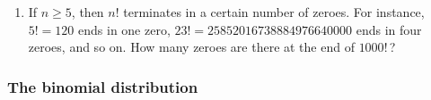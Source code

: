 \begin{enumerate}
\begin{enumerate}
  \item Use Stirling's approximation to show that
\[
a_N\approx \dfrac{e^N}{\sqrt{2\pi N}}.
\]
Calculate the values of this expression for $N=10$ and $N=100$ to get
an idea of how large the sequence $\{a_n\}$ can get.  This shows that
{\em for a while}, the exponential series $\{N^n\}$ can get large much
more rapidly than the series $\{n!\}$.

  \item Show that $a_n<1$ if $n>eN$.  This gives an upper bound on how
long it takes the factorials to catch up with the exponentials.


\end{enumerate}
\item If $n\geq 5$, then $n!$ terminates in a certain number of zeroes.
For instance, $5!=120$ ends in one zero, $23!=25852016738884976640000$
ends in four zeroes, and so on.  How many zeroes are there at the end
of $1000!$\,?

\end{enumerate}
\subsubsection{The binomial distribution}
\label{subsubsec:the-binomial-distribution}




